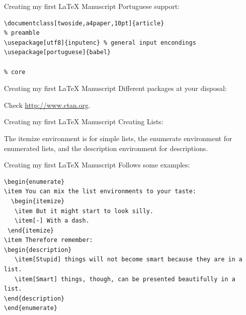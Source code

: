 \begin{frame}[fragile]{Creating my first \LaTeX{} Manuscript}
Portuguese support:
\footnotesize
\begin{verbatim}
\documentclass[twoside,a4paper,10pt]{article}
% preamble
\usepackage[utf8]{inputenc} % general input encondings
\usepackage[portuguese]{babel}

% core

\end{verbatim}
\end{frame}

\begin{frame}[fragile]{Creating my first \LaTeX{} Manuscript}
Different packages at your disposal:
\footnotesize
{}
Check \url{http://www.ctan.org}.
\end{frame}


\begin{frame}[fragile]{Creating my first \LaTeX{} Manuscript}
Creating Lists:

The itemize environment is for simple lists, the enumerate environment for enumerated lists, and the description environment for descriptions.
\end{frame}

\begin{frame}[fragile]{Creating my first \LaTeX{} Manuscript}
Follows some examples:
\scriptsize
\begin{verbatim}
\begin{enumerate}
\item You can mix the list environments to your taste:
  \begin{itemize}
   \item But it might start to look silly.
   \item[-] With a dash.
 \end{itemize}
\item Therefore remember:
\begin{description}
   \item[Stupid] things will not become smart because they are in a list.
   \item[Smart] things, though, can be presented beautifully in a list.
\end{description}
\end{enumerate}
\end{verbatim}
\end{frame}

